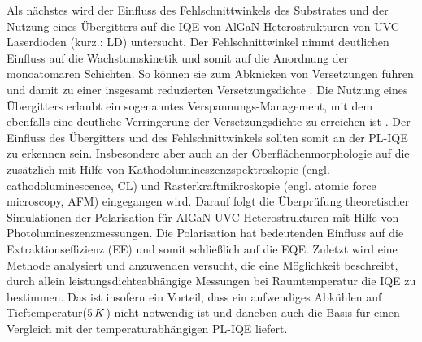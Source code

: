 Als nächstes wird der Einfluss des Fehlschnittwinkels des Substrates und der Nutzung eines Übergitters auf die IQE von AlGaN-Heterostrukturen von UVC-Laserdioden (kurz.: LD) untersucht. Der Fehlschnittwinkel nimmt deutlichen Einfluss auf die Wachstumskinetik und somit auf die Anordnung der monoatomaren Schichten. So können sie zum Abknicken von Versetzungen führen und damit zu einer insgesamt reduzierten Versetzungsdichte \cite{jeschke}. Die Nutzung eines Übergitters erlaubt ein sogenanntes Verspannungs-Management, mit dem ebenfalls eine deutliche Verringerung der Versetzungsdichte zu erreichen ist \cite{doi:10.1063/1.2136424}. Der Einfluss des Übergitters und des Fehlschnittwinkels sollten somit an der PL-IQE zu erkennen sein. Insbesondere aber auch an der Oberflächenmorphologie auf die zusätzlich mit Hilfe von Kathodolumineszenzspektroskopie (engl. cathodoluminescence, CL) und Rasterkraftmikroskopie (engl. atomic force microscopy, AFM) eingegangen wird.
\newline
Darauf folgt die Überprüfung theoretischer Simulationen der Polarisation für AlGaN-UVC-Heterostrukturen mit Hilfe von Photolumineszenzmessungen. Die Polarisation hat bedeutenden Einfluss auf die Extraktionseffizienz (EE) und somit schließlich auf die EQE.
\newline
Zuletzt wird eine Methode analysiert und anzuwenden versucht, die eine Möglichkeit beschreibt, durch allein leistungsdichteabhängige Messungen bei Raumtemperatur die IQE zu bestimmen. Das ist insofern ein Vorteil, dass ein aufwendiges Abkühlen auf Tieftemperatur($5 \thinspace K$) nicht notwendig ist und daneben auch die Basis für einen Vergleich mit der temperaturabhängigen PL-IQE liefert.













